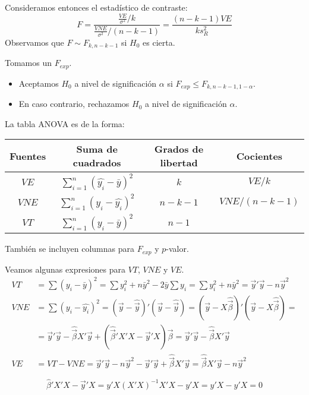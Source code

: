 Consideramos entonces el estadístico de contraste:
$$F = \frac{\frac{VE}{\sigma^2} / k}{\frac{VNE}{\sigma^2} / (n-k-1)} = \frac{(n-k-1)VE}{ks_R^2}$$
Observamos que $F \sim F_{k, n-k-1}$ si $H_0$ es cierta.

Tomamos un $F_{exp}$.
\begin{itemize}
    \item Aceptamos $H_0$ a nivel de significación $\alpha$ si $F_{exp} \leq F_{k, n-k-1, 1-\alpha}$.
    \item En caso contrario, rechazamos $H_0$ a nivel de significación $\alpha$.
\end{itemize}

La tabla ANOVA es de la forma:
\begin{center}
    \begin{tabular}{| c | c | c | c |}
        \hline
        Fuentes & Suma de cuadrados                   & Grados de libertad & Cocientes     \\
        \hline
        $VE$    & $\sum_{i=1}^n(\hat{y_i}-\bar{y})^2$ & $k$                & $VE/k$        \\
        $VNE$   & $\sum_{i=1}^n(y_i - \hat{y_i})^2$   & $n-k-1$            & $VNE/(n-k-1)$ \\
        $VT$    & $\sum_{i=1}^n(y_i - \bar{y})^2$     & $n-1$              &               \\
        \hline
    \end{tabular}
\end{center}
También se incluyen columnas para $F_{exp}$ y $p$-valor.

Veamos algunas expresiones para $VT$, $VNE$ y $VE$.
\begin{align*}
    VT  & = \sum (y_i - \bar{y})^2 = \sum y_i^2 + n\bar{y}^2 - 2\bar{y}\sum y_i = \sum y_i^2 + n\bar{y}^2 = \vec{y}'\vec{y} - n\vec{y}^2                     \\
    VNE & = \sum (y_i - \hat{y_i})^2 = (\vec{y} - \hat{\vec{y}})'(\vec{y} - \hat{\vec{y}}) = (\vec{y} - X\hat{\vec{\beta}})'(\vec{y} - X\hat{\vec{\beta}}) = \\
        & = \vec{y}'\vec{y} - \hat{\vec{\beta}}X'\vec{y} + (\hat{\vec{\beta}}'X'X - \vec{y}'X)\vec{\beta} = \vec{y}'\vec{y} - \hat{\vec{\beta}}X'\vec{y}     \\
    VE  & = VT - VNE = \vec{y}'\vec{y} - n\vec{y}^2 - \vec{y}'\vec{y} + \hat{\vec{\beta}}X'\vec{y} = \hat{\vec{\beta}}X'\vec{y} - n\vec{y}^2
\end{align*}

\begin{note}
    $$\hat{\beta}'X'X - \vec{y}'X = y'X(X'X)^{-1}X'X - y'X = y'X - y'X = 0$$
\end{note}

